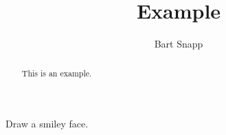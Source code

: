 \documentclass[noauthor,nooutcomes,12pt]{ximera}
\title{Example}
\author{Bart Snapp}
\begin{document}
\begin{abstract}
This is an example.
\end{abstract}
\maketitle


\begin{problem}
  Draw a smiley face.
\end{problem}
\end{document}

